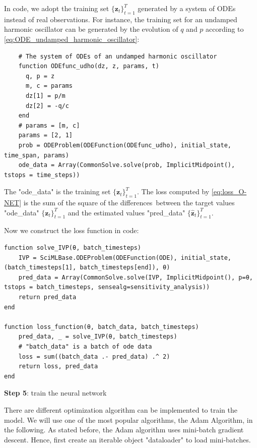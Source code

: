\documentclass[
	parskip, 			   %
	twoside, 			   %
	DIV=14, 			   %
	BCOR=15.0mm, 		   %
	headsepline, 		   %
	open=right, 		   %
	captions=tableheading, %
	bibliography=totoc,    %
	numbers=noenddot       %
]{scrreprt}
\begin{document}
In code, we adopt the training set $\{ \mathbf{z}_{t} \}_{t=1}^{T}$ generated by a system of ODEs instead of real observations. For instance, the training set for an undamped harmonic oscillator can be generated by the evolution of $q$ and $p$ according to \ref{eq:ODE_undamped_harmonic_oscillator}:

\begin{verbatim}
    # The system of ODEs of an undamped harmonic oscillator
    function ODEfunc_udho(dz, z, params, t)
      q, p = z
      m, c = params
      dz[1] = p/m
      dz[2] = -q/c
    end
    # params = [m, c]
    params = [2, 1] 
    prob = ODEProblem(ODEFunction(ODEfunc_udho), initial_state, time_span, params)
    ode_data = Array(CommonSolve.solve(prob, ImplicitMidpoint(), tstops = time_steps))
\end{verbatim}

The "ode\_data" is the training set $\{ \mathbf{z}_{t} \}_{t=1}^{T}$. The loss computed by \ref{eq:loss_O-NET} is the sum of the square of the differences between the target values "ode\_data" $\{ \mathbf{z}_{t} \}_{t=1}^{T}$ and the estimated values "pred\_data" $\{ \mathbf{\hat{z}}_{t} \}_{t=1}^{T}$.

Now we construct the loss function in code:
\begin{verbatim}
function solve_IVP(θ, batch_timesteps)
    IVP = SciMLBase.ODEProblem(ODEFunction(ODE), initial_state, (batch_timesteps[1], batch_timesteps[end]), θ)
    pred_data = Array(CommonSolve.solve(IVP, ImplicitMidpoint(), p=θ, tstops = batch_timesteps, sensealg=sensitivity_analysis))
    return pred_data
end

function loss_function(θ, batch_data, batch_timesteps)
    pred_data, _ = solve_IVP(θ, batch_timesteps)
    # "batch_data" is a batch of ode data
    loss = sum((batch_data .- pred_data) .^ 2)
    return loss, pred_data
end
\end{verbatim}

\textbf{Step 5}: train the neural network

There are different optimization algorithm can be implemented to train the model. We will use one of the most popular algorithms, the Adam Algorithm, in the following. As stated before, the Adam algorithm uses mini-batch gradient descent. Hence, first create an iterable object "dataloader" to load mini-batches.
\end{document}

